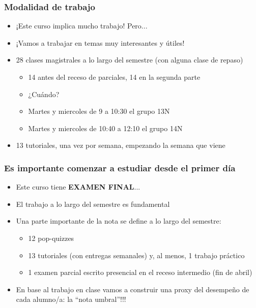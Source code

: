 \documentclass{beamer}
\begin{document}
\begin{frame}
\frametitle{Modalidad de trabajo}
\begin{itemize}
    \item ¡Este curso implica mucho trabajo! Pero...  \vspace{2mm}
    \item ¡Vamos a trabajar en temas muy interesantes y útiles!  \vspace{2mm}
    \item 28 clases magistrales a lo largo del semestre (con alguna clase de repaso)
\begin{itemize}
        \item 14 antes del receso de parciales, 14 en la segunda parte
        \item ¿Cuándo? 
        \item Martes y miercoles de 9 a 10:30 el grupo 13N
        \item Martes y miercoles de 10:40 a 12:10 el grupo 14N
\end{itemize}
    \item 13 tutoriales, una vez por semana, empezando la semana que viene 
\end{itemize}
\end{frame}

\begin{frame}
\frametitle{Es importante comenzar a estudiar desde el primer día}
\begin{itemize}
    \item Este curso tiene \textbf{EXAMEN FINAL}...
    \item El trabajo a lo largo del semestre es fundamental
    \item Una parte importante de la nota se define a lo largo del semestre:
        \begin{itemize}
            \item 12 pop-quizzes
            \item 13 tutoriales (con entregas semanales) y, al menos, 1 trabajo práctico
            \item 1 examen parcial escrito presencial en el receso intermedio (fin de abril)
        \end{itemize}
    \item En base al trabajo en clase vamos a construir una proxy del desempeño de cada alumno/a: la ``nota umbral''!!!
\end{itemize}

\end{frame}
\end{document}
